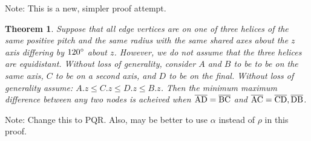 \documentclass[11pt]{article}
\newtheorem{theorem}{Theorem}
\begin{document}
  Note: This is a new, simpler proof attempt.
  \begin{theorem}
    Suppose that all edge vertices are on one of three helices of the same positive pitch and the same radius with the
    same shared axes about the $z$ axis differing by $120\degree$ about $z$.
    However, we do not assume that the three helices are equidistant.
    Without loss of generality, consider $A$ and $B$ to be to be on the same axis, $C$ to be on a second axis, and $D$ to be on the final.
    Without loss of generality assume: $A.z \leq C.z \leq D.z \leq B.z$.
    Then the minimum maximum difference between any two nodes is acheived when
    $ \overline{\rm AD} =  \overline{\rm BC} $ and $ \overline{\rm AC} =  \overline{\rm CD}, \overline{\rm DB} $.
  \end{theorem}
Note: Change this to PQR. Also, may be better to use $\alpha$ instead of $\rho$ in this proof.
\end{document}
